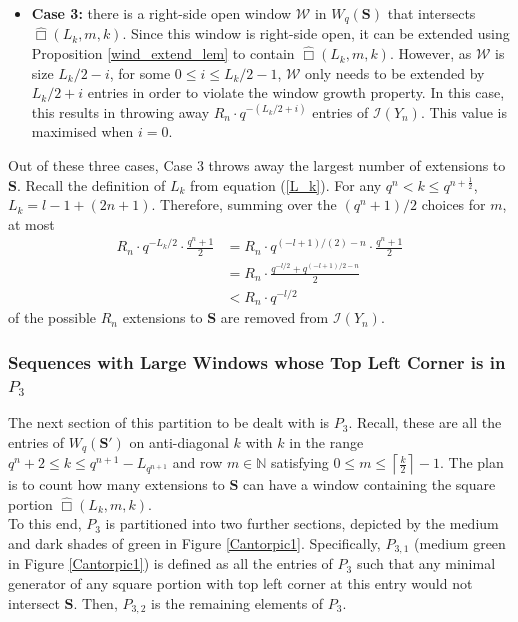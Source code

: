 \documentclass{article}
\theoremstyle{definition}
\newcommand{\N}{\mathbb{N}}
\numberwithin{equation}{subsection}
\begin{document}
\begin{itemize}
    \item \textbf{Case 3:} there is a right-side open window $\mathcal{W}$ in $W_q(\mathbf{S})$ that intersects $\widehat\Box(L_k,m,k)$. Since this window is right-side open, it can be extended using Proposition \ref{wind_extend_lem} to contain $\widehat\Box(L_k,m,k)$. However, as $\mathcal{W}$ is size $L_k/2 - i$, for some $0\le i \le L_k/2-1$, $\mathcal{W}$ only needs to be extended by $L_k/2+i$ entries in order to violate the window growth property. In this case, this results in throwing away $R_n\cdot q^{-(L_k/2+i)}$ entries of $\mathcal{I}(Y_n)$. This value is maximised when $i=0$. \end{itemize}
\noindent Out of these three cases, Case 3 throws away the largest number of extensions to $\mathbf{S}$. Recall the definition of $L_k$ from equation (\ref{L_k}). For any $q^n<k\le q^{n+\frac{1}{2}}$, $L_k=l-1+(2n+1)$. Therefore, summing over the $(q^n+1)/2$ choices for $m$, at most \begin{align}
    R_n\cdot q^{-L_k/2}\cdot \frac{q^n+1}{2}&=R_n\cdot q^{(-l+1)/(2)-n}\cdot \frac{q^n+1}{2}\nonumber\\&=R_n\cdot \frac{q^{-l/2}+q^{(-l+1)/2-n}}{2}\nonumber\\&<R_n\cdot q^{-l/2}\label{blue}
\end{align} of the possible $R_n$ extensions to $\textbf{S}$ are removed from $\mathcal{I}(Y_n)$. 
\subsubsection*{Sequences with Large Windows whose Top Left Corner is in $P_3$}

\noindent The next section of this partition to be dealt with is $P_3$. Recall, these are all the entries of $W_q(\mathbf{S}')$ on anti-diagonal $k$ with $k$ in the range $q^n+2\le k\le q^{n+1}-L_{q^{n+1}}$ and row $m\in\N$ satisfying $0\le m \le \left\lceil \frac{k}{2}\right\rceil-1$. The plan is to count how many extensions to $\mathbf{S}$ can have a window containing the square portion $\widehat\Box(L_k,m,k)$. \\

\noindent To this end, $P_3$ is partitioned into two further sections, depicted by the medium and dark shades of green in Figure \ref{Cantorpic1}. Specifically, $P_{3,1}$ (medium green in Figure \ref{Cantorpic1}) is defined as all the entries of $P_3$ such that any minimal generator of any square portion with top left corner at this entry would not intersect $\mathbf{S}$. Then, $P_{3,2}$ is the remaining elements of $P_3$.\\
\end{document}
